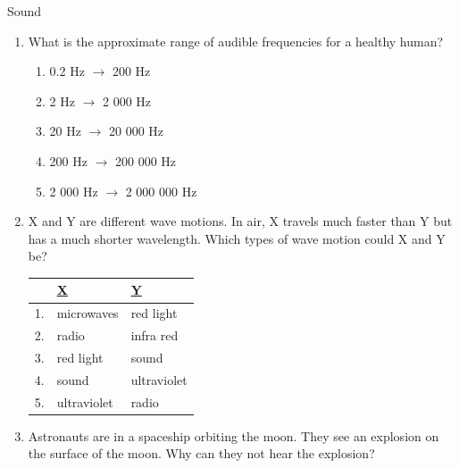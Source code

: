 \begin{eocexercises}{Sound}
\begin{enumerate}[noitemsep, label=\textbf{\arabic*}. ]
\begin{enumerate}[noitemsep, label=\textbf{\alph*}. ]
\end{enumerate}
                \label{m38800*uid40}\item What is the approximate range of audible frequencies for a healthy human?
\label{m38800*id186144}\begin{enumerate}[noitemsep, label=\textbf{\alph*}. ] 
            \label{m38800*uid41}\item 0.2 Hz $\to $ 200 Hz
\label{m38800*uid42}\item 2 Hz $\to $ 2 000 Hz
\label{m38800*uid43}\item 20 Hz $\to $ 20 000 Hz
\label{m38800*uid44}\item 200 Hz $\to $ 200 000 Hz
\label{m38800*uid45}\item 2 000 Hz $\to $ 2 000 000 Hz
\end{enumerate}
                \label{m38800*uid46}\item X and Y are different wave motions. In air, X travels much faster than Y but has a much shorter wavelength. Which types of wave motion could X and Y be?
          \begin{table}[H]
        \begin{center}
      \label{m38800*id186268}
    \noindent
      \begin{tabular}{|l|l|l|}\hline
         &
        \uline{X} &
        \uline{Y} \\ \hline
        1. &
        microwaves &
        red light \\ \hline
        2. &
        radio &
        infra red \\ \hline
        3. &
        red light &
        sound \\ \hline
        4. &
        sound &
        ultraviolet \\ \hline
        5. &
        ultraviolet &
        radio \\ \hline
    \end{tabular}
      \end{center}
\end{table}
    \par
          \label{m38800*uid47}\item Astronauts are in a spaceship orbiting the moon. They see an explosion on the surface of the moon. Why can they not hear the explosion?
\label{m38800*id186399}\begin{enumerate}[noitemsep, label=\textbf{\alph*}. ] 

\end{enumerate}
\end{enumerate}
\end{eocexercises}
